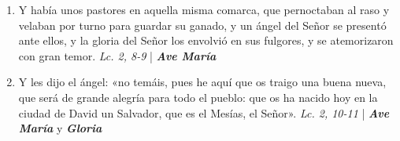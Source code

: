 \documentclass[../../devocionario.tex]{subfiles}
\begin{document}
\begin{enumerate}
        \item Y había unos pastores en aquella misma comarca, que pernoctaban al raso y velaban por turno para guardar su ganado, 
            y un ángel del Señor se presentó ante ellos, y la gloria del Señor los envolvió en sus fulgores, 
            y se atemorizaron con gran temor. \textit{Lc. 2, 8-9} | \textbf{\textit{Ave María}}

        \item Y les dijo el ángel: «no temáis, pues he aquí que os traigo una buena nueva, que será de grande alegría para todo el pueblo: 
            que os ha nacido hoy en la ciudad de David un Salvador, 
            que es el Mesías, el Señor». \textit{Lc. 2, 10-11} | \textbf{\textit{Ave María}} y \textbf{\textit{Gloria}}
    
    \end{enumerate}
\end{document}
